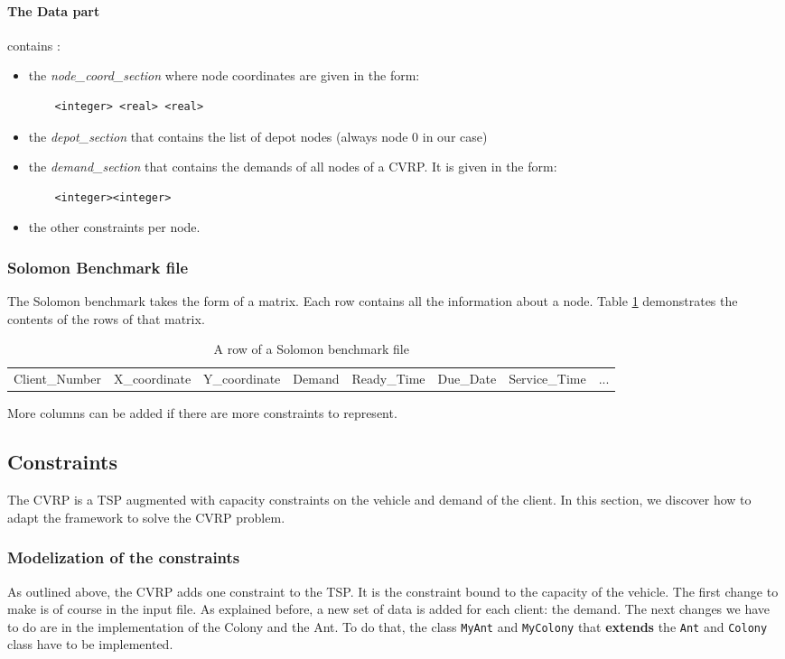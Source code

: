 \paragraph{The Data part} contains : 
\begin{itemize}
	\item the \emph{node\_coord\_section} where node coordinates are given in the form:
	\begin{verbatim}
	<integer> <real> <real>
	\end{verbatim}
	\item the \emph{depot\_section} that contains the list of depot nodes (always node 0 in our case)
	\item the \emph{demand\_section} that contains the demands of all nodes of a CVRP. It is given in the form: 
	\begin{verbatim}
	<integer><integer>
	\end{verbatim}
	\item the other constraints per node.
\end{itemize}

\subsubsection{Solomon Benchmark file}
The Solomon benchmark takes the form of a matrix. Each row contains all the information about a node. Table \ref{tab:Solomon} demonstrates the contents of the rows of that matrix.

\begin{table}%
\centering
\tiny
\begin{tabular}{l|l|l|l|l|l|l|l}
Client\_Number & X\_coordinate & Y\_coordinate & Demand & Ready\_Time & Due\_Date & Service\_Time & ... \\
\end{tabular}
\caption{A row of a Solomon benchmark file}
\label{tab:Solomon}
\end{table}
More columns can be added if there are more constraints to represent.
\cite{solomon}

\subsection{Constraints}
The CVRP is a TSP augmented with capacity constraints on the vehicle and demand of the client. In this section, we discover how to adapt the framework to solve the CVRP problem.
 
\subsubsection{Modelization of the constraints}
As outlined above, the CVRP adds one constraint to the TSP. It is the constraint bound to the capacity of the vehicle. 
The first change to make is of course in the input file. As explained before, a new set of data is added for each client: the demand.
The next changes we have to do are in the implementation of the Colony and the Ant. To do that, the class \texttt{MyAnt} and \texttt{MyColony} that \textbf{extends} the \texttt{Ant} and \texttt{Colony} class have to be implemented. 
